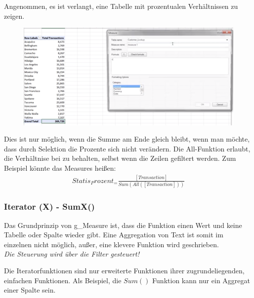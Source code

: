 Angenommen, es ist verlangt, eine Tabelle mit prozentualen Verhältnissen zu zeigen. \begin{figure}[H]
	\centering
	\includegraphics[scale = 0.3]{attachment/chapter_1/screenshot105}
	\caption{}
	\label{fig:screenshot105}
\end{figure} 
Dies ist nur möglich, wenn die Summe am Ende gleich bleibt, wenn man möchte, dass durch Selektion die Prozente sich nicht verändern. Die All-Funktion erlaubt, die Verhältnise bei zu behalten, selbst wenn die Zeilen gefiltert werden.
Zum Beispiel könnte das Measures heißen:
\begin{align}
Statis_Prozent_=\frac{[Transaction]}{Sum(All([Transaction]))} 
\end{align} 
\subsubsection{Iterator (X) - SumX()}
Das Grundprinzip von \gls{g_Measure} ist, dass die Funktion einen Wert und keine Tabelle oder Spalte wieder gibt. Eine Aggregation von Text ist somit im einzelnen nicht möglich, außer, eine klevere Funktion wird geschrieben. \\
\textit{Die Steuerung wird über die Filter gesteuert!}

Die Iteratorfunktionen sind nur erweiterte Funktionen ihrer zugrundeliegenden, einfachen Funktionen. Als Beispiel, die $Sum()$ Funktion kann nur ein Aggregat einer Spalte sein. 

